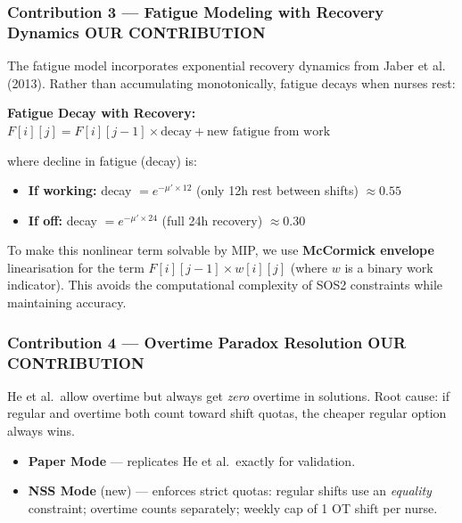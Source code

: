 \documentclass[12pt,a4paper]{article}
\newcommand{\contribbadge}{\colorbox{accentred}{\tiny\color{white}\textbf{OUR CONTRIBUTION}}\,}
\begin{document}
\subsubsection{Contribution 3 — Fatigue Modeling with Recovery Dynamics \contribbadge}

The fatigue model incorporates exponential recovery dynamics from Jaber et al. (2013). Rather than accumulating monotonically, fatigue decays when nurses rest:

\begin{eqbox}
\textbf{Fatigue Decay with Recovery:}  $F[i][j] = F[i][j-1] \times \text{decay} + \text{new fatigue from work}$

where decline in fatigue (decay) is:
\begin{itemize}[itemsep=2pt]
  \item \textbf{If working:} decay $= e^{-\mu' \times 12}$ (only 12h rest between shifts) $\approx 0.55$
  \item \textbf{If off:} decay $= e^{-\mu' \times 24}$ (full 24h recovery) $\approx 0.30$
\end{itemize}
\end{eqbox}

To make this nonlinear term solvable by MIP, we use \textbf{McCormick envelope} linearisation for the term $F[i][j-1] \times w[i][j]$ (where $w$ is a binary work indicator). This avoids the computational complexity of SOS2 constraints while maintaining accuracy.

\subsubsection{Contribution 4 — Overtime Paradox Resolution \contribbadge}

\begin{problembox}[Issue in He et al., 2019]
He et al.\ allow overtime but always get \emph{zero} overtime in solutions. Root cause: if regular and overtime both count toward shift quotas, the cheaper regular option always wins.
\end{problembox}

\begin{contribbox}
\begin{itemize}[itemsep=2pt]
  \item \textbf{Paper Mode} — replicates He et al.\ exactly for validation.
  \item \textbf{NSS Mode} (new) — enforces strict quotas: regular shifts use an \emph{equality} constraint; overtime counts separately; weekly cap of 1 OT shift per nurse.
\end{itemize}
\end{contribbox}
\end{document}

